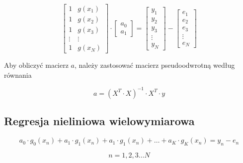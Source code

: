 \begin{equation*}
    \begin{bmatrix}
            1 & g(x_1)\\
            1 & g(x_2)\\
            1 & g(x_3)\\
            \vdots & \vdots \\ 
            1 & g(x_N) 
    \end{bmatrix}
\cdot \begin{bmatrix}
    a_0 \\ a_1 
\end{bmatrix}
 = \begin{bmatrix}
    y_1 \\ y_2 \\ y_3 \\ \vdots \\ y_N
\end{bmatrix} - \begin{bmatrix}
    e_1\\e_2\\e_3\\\vdots\\e_N
\end{bmatrix}
\end{equation*}

Aby obliczyć macierz $a$, należy zastosować macierz pseudoodwrotną
według równania

\begin{equation*}
a = ( X^T \cdot X)^{-1} \cdot X^T \cdot y
\end{equation*}

\subsection*{Regresja nieliniowa wielowymiarowa}

\begin{equation*}
    a_0 \cdot g_0(x_n) + a_1 \cdot g_1(x_n) + a_1 \cdot g_1(x_n) + \hdots + a_K \cdot g_K(x_n) = y_n - e_n 
\end{equation*}

\begin{equation*}
    n = 1, 2, 3 \hdots N
\end{equation*}

